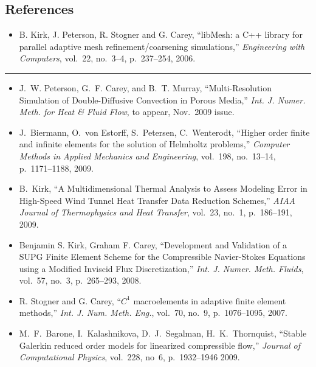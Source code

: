 \subsection*{References}
\begin{frame}[t]
  \tiny %
    \begin{itemize}
    \item{
      B. Kirk, J. Peterson, R. Stogner and G. Carey, ``libMesh: a C++
      library for parallel adaptive mesh refinement/coarsening
      simulations,''  \emph{Engineering with Computers}, vol.~22, no.~3--4, p.~237--254, 2006.
      }
     \end{itemize}
     \rule{\textwidth}{1pt}
     \begin{itemize}
\item{
J.~W. Peterson, G.~F. Carey, and B.~T. Murray, ``{Multi-Resolution Simulation
  of Double-Diffusive Convection in Porous Media},'' {\em Int. J. Numer. Meth.
  for Heat \& Fluid Flow}, to appear, Nov.\ 2009 issue.
}
    \item{
        J.~Biermann, O.~von Estorff, S.~Petersen, C.~Wenterodt,      
        ``Higher order finite and infinite elements for the solution of Helmholtz problems,''
        \emph{Computer Methods in Applied Mechanics and Engineering}, vol.~198,
        no.~13--14, p.~1171--1188, 2009.
      }
    \item{
      B.~Kirk, ``A Multidimensional Thermal Analysis to Assess Modeling Error in High-Speed
      Wind Tunnel Heat Transfer Data Reduction Schemes,''
      \emph{AIAA Journal of Thermophysics and Heat Transfer}, vol.~23, no.~1, p.~186--191, 2009.       
    }
  \item{
      Benjamin S. Kirk, Graham F. Carey, 
      ``Development and Validation of a SUPG Finite Element Scheme for the Compressible
      Navier-Stokes Equations using a Modified Inviscid Flux Discretization,''
      \emph{Int. J. Numer. Meth. Fluids}, vol.~57, no.~3, p.~265--293, 2008.
    }
  \item{R. Stogner and G. Carey, ``$C^1$ macroelements in adaptive finite
      element methods,''
      \emph{Int. J. Num. Meth. Eng.}, vol.~70, no.~9, p.~1076--1095, 2007.
      }
  \item{
    M.~F.~Barone, I.~Kalashnikova, D.~J.~Segalman, H.~K.~Thornquist,
    ``Stable Galerkin reduced order models for linearized compressible flow,''
    \emph{Journal of Computational Physics}, vol.~228, no~6, p.~1932--1946 2009.}


\end{itemize}
\end{frame}
